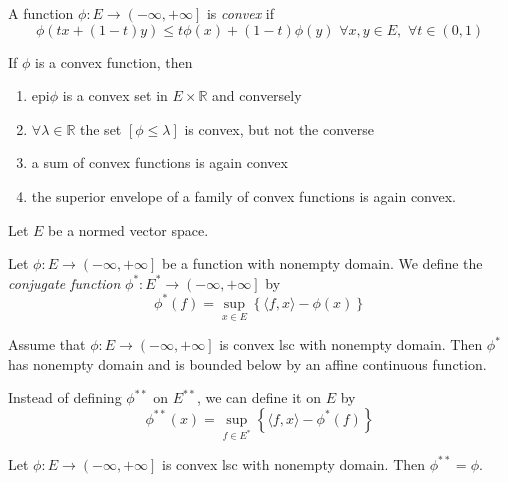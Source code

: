 \begin{defn}
	A function $ \phi: E \to \left( - \infty, + \infty \right]$ is \textit{convex} if
	\[
		\phi \left( tx + (1-t)y \right) \leq t \phi(x) + (1-t) \phi(y) \hspace{4pt} \forall x,y \in E, \hspace{4pt} \forall t \in \left( 0,1 \right)
	\]
	
\end{defn}

\begin{prop}
	If $ \phi$ is a convex function, then
\begin{enumerate}
	\item $ \mathrm{epi} \phi$ is a convex set in $ E \times \mathbb{R}$ and conversely
	\item $ \forall \lambda \in \mathbb{R}$ the set $ \left[ \phi \leq \lambda \right]$ is convex, but not the converse
	\item a sum of convex functions is again convex
	\item the superior envelope of a family of convex functions is again convex.
\end{enumerate}
\end{prop}

Let $E$ be a normed vector space.

\begin{defn}
	Let $ \phi: E \to \left( - \infty , + \infty \right]$ be a function with nonempty domain. We define the \textit{conjugate function} $ \phi^* : E^* \to \left( - \infty, + \infty \right]$ by 
	\[
		\phi^* (f) = \sup_{x \in E} \left\{ \langle f,x \rangle - \phi(x) \right\}
	\]
\end{defn}


\begin{prop}
	Assume that $ \phi: E \to \left( - \infty, + \infty \right]$ is convex lsc with nonempty domain. Then $ \phi^*$ has nonempty domain and is bounded below by an affine continuous function.
\end{prop}

\begin{defn}
Instead of defining $ \phi^{**}$ on $E^{**}$, we can define it on $E$ by
\[
	\phi^{**}(x) = \sup_{f \in E^*} \left\{ \langle f,x \rangle - \phi^* (f) \right\}
\]

\end{defn}

\begin{thm}
	Let $ \phi: E \to \left( - \infty, + \infty \right]$ is convex lsc with nonempty domain. Then $ \phi^{**} = \phi$.
\end{thm}


